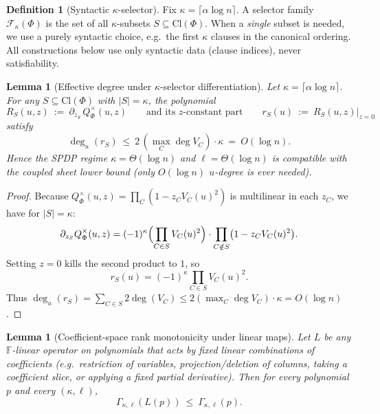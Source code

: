 \documentclass[12pt]{article}
\newtheorem{lemma}[theorem]{Lemma}
\theoremstyle{definition}
\newtheorem{definition}{Definition}
\theoremstyle{definition}
\theoremstyle{remark}
\theoremstyle{remark}
\begin{document}
\begin{definition}[Syntactic $\kappa$-selector]\label{def:syntactic-k-selector}
Fix $\kappa=\lceil \alpha\log n\rceil$. A selector family $\mathcal{F}_\kappa(\Phi)$ is the set
of all $\kappa$-subsets $S\subseteq \mathrm{Cl}(\Phi)$. When a \emph{single} subset is needed,
we use a purely syntactic choice, e.g.\ the first $\kappa$ clauses in the canonical ordering.
All constructions below use only syntactic data (clause indices), never satisfiability.
\end{definition}


\begin{lemma}[Effective degree under $\kappa$-selector differentiation]\label{lem:effective-degree}
Let $\kappa=\lceil \alpha\log n\rceil$. For any $S\subseteq \mathrm{Cl}(\Phi)$ with $|S|=\kappa$,
the polynomial
\[
R_S(u,z)\ :=\ \partial_{z_S}\, Q_\Phi^{\times}(u,z)
\qquad\text{and its $z$-constant part}\qquad
r_S(u)\ :=\ R_S(u,z)\big|_{z=0}
\]
satisfy
\[
\deg_u(r_S)\ \le\ 2\,(\max_C \deg V_C)\cdot \kappa\ =\ O(\log n).
\]
Hence the SPDP regime $\kappa=\Theta(\log n)$ and $\ell=\Theta(\log n)$ is compatible with
the coupled sheet lower bound (only $O(\log n)$ $u$-degree is ever needed).
\end{lemma}

\begin{proof}
Because $Q_\Phi^{\times}(u,z)=\prod_C (1 - z_C V_C(u)^2)$ is multilinear in each $z_C$,
we have for $|S|=\kappa$:
\[
\partial_{z_S} Q_\Phi^{\times}(u,z)
=
(-1)^\kappa\Bigl(\prod_{C\in S} V_C(u)^2\Bigr)\cdot
\prod_{C\notin S}\bigl(1 - z_C V_C(u)^2\bigr).
\]
Setting $z=0$ kills the second product to $1$, so
\[
r_S(u)=(-1)^\kappa\prod_{C\in S} V_C(u)^2.
\]
Thus $\deg_u(r_S)=\sum_{C\in S} 2\deg(V_C)\le 2(\max_C \deg V_C)\cdot \kappa = O(\log n)$.
\end{proof}


\begin{lemma}[Coefficient-space rank monotonicity under linear maps]\label{lem:rank-monotone-linear}
Let $L$ be any $\mathbb{F}$-linear operator on polynomials that acts by
\emph{fixed} linear combinations of coefficients (e.g.\ restriction of variables,
projection/deletion of columns, taking a coefficient slice, or applying a fixed partial
derivative). Then for every polynomial $p$ and every $(\kappa,\ell)$,
\[
\Gamma_{\kappa,\ell}(L(p))\ \le\ \Gamma_{\kappa,\ell}(p).
\]
\end{lemma}
\end{document}
